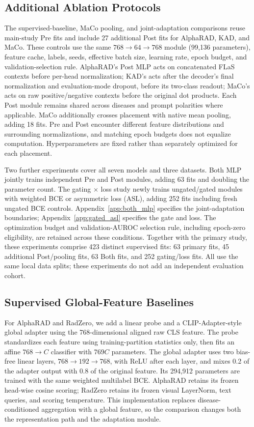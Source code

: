 \documentclass[10pt,twocolumn,letterpaper]{article}
\begin{document}
\subsection{Additional Ablation Protocols}
\label{sec:ablation_protocol}
The supervised-baseline, MaCo pooling, and joint-adaptation comparisons reuse main-study Pre fits and include 27 additional Post fits for AlphaRAD, KAD, and MaCo. These controls use the same $768\to64\to768$ module (99,136 parameters), feature cache, labels, seeds, effective batch size, learning rate, epoch budget, and validation-selection rule. AlphaRAD's Post MLP acts on concatenated FLaS contexts before per-head normalization; KAD's acts after the decoder's final normalization and evaluation-mode dropout, before its two-class readout; MaCo's acts on raw positive/negative contexts before the original dot products. Each Post module remains shared across diseases and prompt polarities where applicable. MaCo additionally crosses placement with native mean pooling, adding 18 fits. Pre and Post encounter different feature distributions and surrounding normalizations, and matching epoch budgets does not equalize computation. Hyperparameters are fixed rather than separately optimized for each placement.

Two further experiments cover all seven models and three datasets. Both MLP jointly trains independent Pre and Post modules, adding 63 fits and doubling the parameter count. The gating $\times$ loss study newly trains ungated/gated modules with weighted BCE or asymmetric loss (ASL), adding 252 fits including fresh ungated BCE controls. Appendix~\ref{app:both_mlp} specifies the joint-adaptation boundaries; Appendix~\ref{app:gated_asl} specifies the gate and loss. The optimization budget and validation-AUROC selection rule, including epoch-zero eligibility, are retained across these conditions. Together with the primary study, these experiments comprise 423 distinct supervised fits: 63 primary fits, 45 additional Post/pooling fits, 63 Both fits, and 252 gating/loss fits. All use the same local data splits; these experiments do not add an independent evaluation cohort.

\subsection{Supervised Global-Feature Baselines}
\label{sec:supervised_baseline_protocol}
For AlphaRAD and RadZero, we add a linear probe and a CLIP-Adapter-style global adapter using the 768-dimensional aligned raw CLS feature. The probe standardizes each feature using training-partition statistics only, then fits an affine $768\to C$ classifier with $769C$ parameters. The global adapter uses two bias-free linear layers, $768\to192\to768$, with ReLU after each layer, and mixes 0.2 of the adapter output with 0.8 of the original feature. Its 294,912 parameters are trained with the same weighted multilabel BCE. AlphaRAD retains its frozen head-wise cosine scoring; RadZero retains its frozen visual LayerNorm, text queries, and scoring temperature. This implementation replaces disease-conditioned aggregation with a global feature, so the comparison changes both the representation path and the adaptation module.
\end{document}
